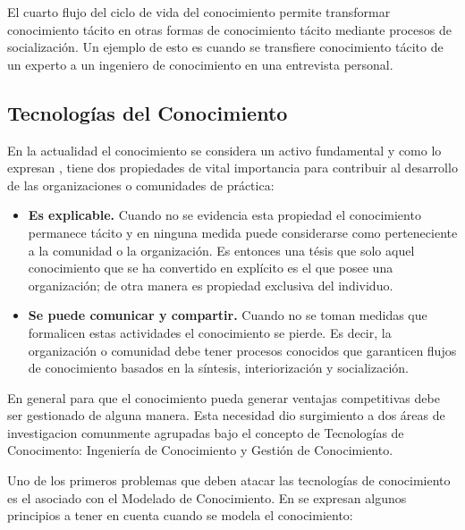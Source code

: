 El cuarto flujo del ciclo de vida del conocimiento permite transformar conocimiento tácito en otras formas de conocimiento tácito mediante procesos de socialización. Un ejemplo de esto es cuando se transfiere conocimiento tácito de un experto a un ingeniero de conocimiento en una entrevista personal.

\subsection{Tecnologías del Conocimiento}

En la actualidad el conocimiento se considera un activo fundamental y como lo expresan \cite{martinez1998}, tiene dos propiedades de vital importancia para contribuir al desarrollo de las organizaciones o comunidades de práctica:

\begin{itemize}
\item \textbf{Es explicable.} Cuando no se evidencia esta propiedad el conocimiento permanece tácito y en ninguna medida puede considerarse como perteneciente a la comunidad o la organización. Es entonces una tésis que solo aquel conocimiento que se ha convertido en explícito es el que posee una organización; de otra manera es propiedad exclusiva del individuo.

\item \textbf{Se puede comunicar y compartir.} Cuando no se toman medidas que formalicen estas actividades el conocimiento se pierde. Es decir, la organización o comunidad debe tener procesos conocidos que garanticen flujos de conocimiento basados en la síntesis, interiorización y socialización.
\end{itemize}

En general para que el conocimiento pueda generar ventajas competitivas debe ser gestionado de alguna manera. Esta necesidad dio surgimiento a dos áreas de investigacion comunmente agrupadas bajo el concepto de Tecnologías de Conocimento: Ingeniería de Conocimiento y Gestión de Conocimiento. 

Uno de los primeros problemas que deben atacar las tecnologías de conocimiento es el asociado con el Modelado de Conocimiento. En \cite{wielinga1992} se expresan algunos principios a tener en cuenta cuando se modela el conocimiento:


